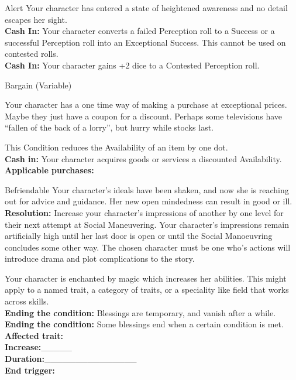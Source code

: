 \documentclass[10pt, frontgrid, backgrid]{flacards}
\begin{document}
\BCond
{Alert}
{Your character has entered a state of heightened awareness and no detail escapes her sight. \\
\textbf{Cash In:} Your character converts a failed Perception roll to a Success or a successful Perception roll into an Exceptional Success. This cannot be used on contested rolls.\\
\textbf{Cash In:} Your character gains +2 dice to a Contested Perception roll.}

\BCond
{Bargain (Variable)}
{Your character has a one time way of making a purchase at exceptional prices. Maybe they just have a coupon for a discount. Perhaps some televisions have \textquotedblleft fallen of the back of a lorry\textquotedblright, but hurry while stocks last. 

This Condition reduces the Availability of an item by one dot.\\
\textbf{Cash in:} Your character acquires goods or services a discounted Availability. \\
\textbf{Applicable purchases:}\fillunderline}

\Cond
{Befriendable}
{
Your character's ideals have been shaken, and now she is reaching out for advice and guidance. Her new open mindedness can result in good or ill. \\
\textbf{Resolution:} Increase your character's impressions of another by one level for their next attempt at Social Maneuvering. Your character's impressions remain artificially high until her last door is open or until the Social Manoeuvring concludes some other way. The chosen character must be one who's actions will introduce drama and plot complications to the story. 
}

{Your character is enchanted by magic which increases her abilities. This might apply to a named trait, a category of traits, or a speciality like field that works across skills.\\
\textbf{Ending the condition:} Blessings are temporary, and vanish after a while.\\
\textbf{Ending the condition:} Some blessings end when a certain condition is met.\\
\textbf{Affected trait:}\fillunderline\\
\textbf{Increase:}\_\_\_\_\_\\
\textbf{Duration:}\_\_\_\_\_\_\_\_\_\_\_\_\_\_\_\\
\textbf{End trigger:}\fillunderline}
\end{document}
